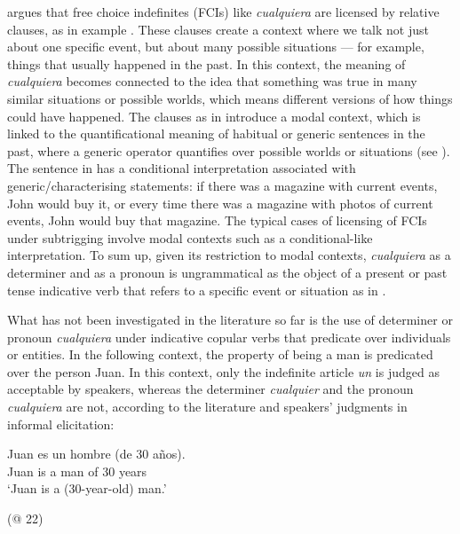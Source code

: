 \citet{Quer2000} argues that free choice indefinites (FCIs) like \textit{cualquiera} are licensed by relative clauses, as in example . These clauses create a context where we talk not just about one specific event, but about many possible situations — for example, things that usually happened in the past. In this context, the meaning of \textit{cualquiera} becomes connected to the idea that something was true in many similar situations or possible worlds, which means different versions of how things could have happened. The clauses as in  introduce a modal context, which is linked to the quantificational meaning of habitual or generic sentences in the past, where a generic operator quantifies over possible worlds or situations (see \citealt{Krifka1995}). The sentence in  has a conditional interpretation associated with generic/characterising statements: if there was a magazine with current events, John would buy it, or every time there was a magazine with photos of current events, John would buy that magazine. The typical cases of licensing of FCIs under subtrigging involve modal contexts such as a conditional-like interpretation. To sum up, given its restriction to modal contexts, \textit{cualquiera} as a determiner and as a pronoun is ungrammatical as the object of a present or past tense indicative verb that refers to a specific event or situation as in .

What has not been investigated in the literature so far is the use of determiner or pronoun \textit{cualquiera} under indicative copular verbs that predicate over individuals or entities. In the following context, the property of being a man is predicated over the person Juan. In this context, only the indefinite article \textit{un} is judged as acceptable by speakers, whereas the determiner \textit{cualquier} and the pronoun \textit{cualquiera} are not, according to the literature \citet{Alonso-OvalleMenéndez-Benito2011} and speakers' judgments in informal elicitation:

\ea
\label{ex:key:34} %
  \gll Juan es un hombre (de 30 años).\\
  Juan is a man {of} 30 years\\
  \glt ‘Juan is a (30-year-old) man.’
  
  (@ 22)
\z

\ea
\z
\z 

